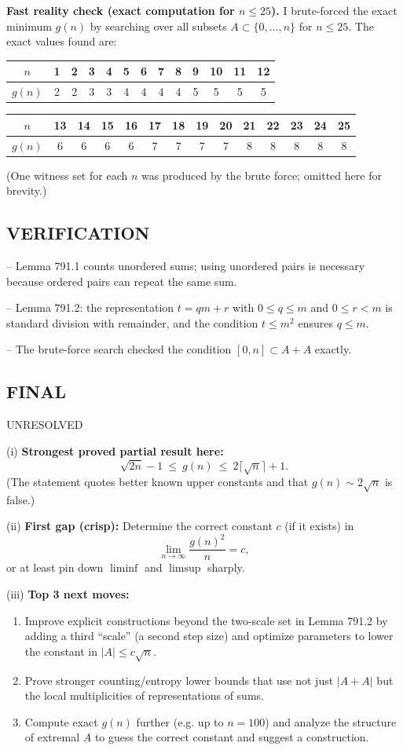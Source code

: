 \medskip
\textbf{Fast reality check (exact computation for $n\le 25$).}
I brute-forced the exact minimum $g(n)$ by searching over all subsets $A\subset\{0,\dots,n\}$ for $n\le 25$.
The exact values found are:
\begin{center}
\begin{tabular}{c|cccccccccccc}
$n$ &1&2&3&4&5&6&7&8&9&10&11&12\\\hline
$g(n)$ &2&2&3&3&4&4&4&4&5&5&5&5
\end{tabular}

\medskip
\begin{tabular}{c|ccccccccccccc}
$n$ &13&14&15&16&17&18&19&20&21&22&23&24&25\\\hline
$g(n)$ &6&6&6&6&7&7&7&7&8&8&8&8&8
\end{tabular}
\end{center}
(One witness set for each $n$ was produced by the brute force; omitted here for brevity.)

\subsection*{VERIFICATION}
-- Lemma 791.1 counts unordered sums; using unordered pairs is necessary because ordered pairs can repeat the same sum.

-- Lemma 791.2: the representation $t=qm+r$ with $0\le q\le m$ and $0\le r<m$ is standard division with remainder, and the condition $t\le m^2$ ensures $q\le m$.

-- The brute-force search checked the condition $[0,n]\subset A+A$ exactly.

\subsection*{FINAL}
UNRESOLVED

(i) \textbf{Strongest proved partial result here:}
\[\sqrt{2n}-1\ \le\ g(n)\ \le\ 2\lceil\sqrt n\rceil+1.
\]
(The statement quotes better known upper constants and that $g(n)\sim 2\sqrt n$ is false.)

(ii) \textbf{First gap (crisp):} Determine the correct constant $c$ (if it exists) in
\[\lim_{n\to\infty} \frac{g(n)^2}{n}=c,
\]
or at least pin down $\liminf$ and $\limsup$ sharply.

(iii) \textbf{Top 3 next moves:}
\begin{enumerate}
\item Improve explicit constructions beyond the two-scale set in Lemma 791.2 by adding a third ``scale'' (a second step size) and optimize parameters to lower the constant in $|A|\le c\sqrt n$.
\item Prove stronger counting/entropy lower bounds that use not just $|A+A|$ but the local multiplicities of representations of sums.
\item Compute exact $g(n)$ further (e.g. up to $n=100$) and analyze the structure of extremal $A$ to guess the correct constant and suggest a construction.
\end{enumerate}

